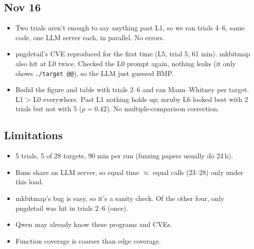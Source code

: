 \documentclass[10pt]{article}
\begin{document}
\subsection*{Nov 16}
\begin{itemize}
\item Two trials aren't enough to say anything past L1, so we ran trials 4--6, same code, one
LLM server each, in parallel. No errors.
\item pngdetail's CVE reproduced for the first time (L5, trial 5, 61 min). mkbitmap also hit at
L0 twice. Checked the L0 prompt again, nothing leaks (it only shows \texttt{./target @@}), so
the LLM just guessed BMP.
\item Redid the figure and table with trials 2--6 and ran Mann--Whitney per target. L1 > L0
everywhere. Past L1 nothing holds up; mruby L6 looked best with 2 trials but not with 5
(\(p = 0.42\)). No multiple-comparison correction.
\end{itemize}

\subsection*{Limitations}
\begin{itemize}
\item 5 trials, 5 of 28 targets, 90 min per run (fuzzing papers usually do 24\,h).
\item Runs share an LLM server, so equal time $\approx$ equal calls (23--28) only under this load.
\item mkbitmap's bug is easy, so it's a sanity check. Of the other four, only pngdetail was hit
in trials 2--6 (once).
\item Qwen may already know these programs and CVEs.
\item Function coverage is coarser than edge coverage.
\end{itemize}
\end{document}
